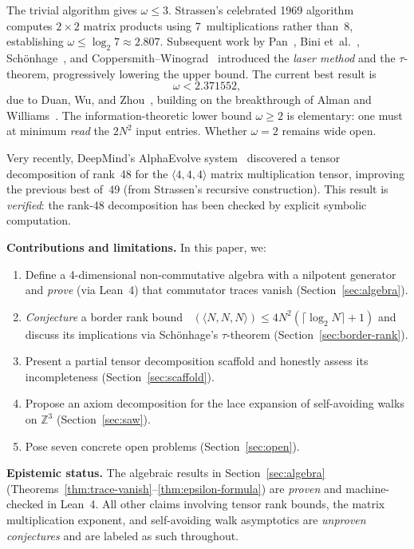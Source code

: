 \documentclass[11pt,a4paper]{article}
\theoremstyle{definition}
\theoremstyle{remark}
\DeclareMathOperator{\brank}{\underline{R}}
\newcommand{\mmtensor}[3]{\langle #1, #2, #3 \rangle}
\begin{document}
The trivial algorithm gives $\omega \le 3$. Strassen's celebrated 1969
algorithm~\cite{Strassen1969} computes $2 \times 2$ matrix products
using 7~multiplications rather than~8, establishing
$\omega \le \log_2 7 \approx 2.807$. Subsequent work by
Pan~\cite{Pan1980}, Bini et~al.~\cite{Bini1979}, Sch\"onhage~\cite{Schonhage1981},
and Coppersmith--Winograd~\cite{CW1990} introduced the
\emph{laser method} and the $\tau$-theorem, progressively lowering the
upper bound. The current best result is
\begin{equation}\label{eq:omega-record}
  \omega < 2.371552,
\end{equation}
due to Duan, Wu, and Zhou~\cite{DWZ2023},
building on the breakthrough of Alman and Williams~\cite{AW2021}.
The information-theoretic lower bound $\omega \ge 2$ is elementary:
one must at minimum \emph{read} the $2N^2$ input entries. Whether
$\omega = 2$ remains wide open.

Very recently, DeepMind's AlphaEvolve system~\cite{AlphaEvolve2025}
discovered a tensor decomposition of rank~48 for the
$\mmtensor{4}{4}{4}$ matrix multiplication tensor, improving the
previous best of~49 (from Strassen's recursive construction). This
result is \emph{verified}: the rank-48 decomposition has been checked
by explicit symbolic computation.

\medskip
\noindent\textbf{Contributions and limitations.}
In this paper, we:
\begin{enumerate}
  \item Define a 4-dimensional non-commutative algebra with a nilpotent
        generator and \emph{prove} (via Lean~4) that commutator traces
        vanish (Section~\ref{sec:algebra}).
  \item \emph{Conjecture} a border rank bound
        $\brank(\mmtensor{N}{N}{N}) \le 4N^2(\lceil \log_2 N \rceil + 1)$
        and discuss its implications via Sch\"onhage's $\tau$-theorem
        (Section~\ref{sec:border-rank}).
  \item Present a partial tensor decomposition scaffold and honestly
        assess its incompleteness (Section~\ref{sec:scaffold}).
  \item Propose an axiom decomposition for the lace expansion of
        self-avoiding walks on $\mathbb{Z}^3$
        (Section~\ref{sec:saw}).
  \item Pose seven concrete open problems (Section~\ref{sec:open}).
\end{enumerate}

\noindent\textbf{Epistemic status.} The algebraic results in
Section~\ref{sec:algebra} (Theorems~\ref{thm:trace-vanish}--\ref{thm:epsilon-formula})
are \emph{proven} and machine-checked in Lean~4. All other claims
involving tensor rank bounds, the matrix multiplication exponent,
and self-avoiding walk asymptotics are \emph{unproven conjectures}
and are labeled as such throughout.
\end{document}
